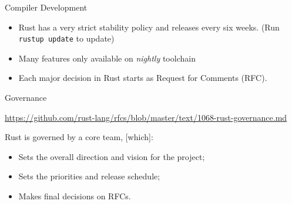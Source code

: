 \documentclass{beamer}
\begin{document}
\begin{frame}{Compiler Development} 
\begin{itemize} [label=$\bullet$] 
\item
Rust has a very strict stability policy and releases every six weeks. (Run
\texttt{rustup update} to update)
\item
Many features only available on \emph{nightly} toolchain
\item 
Each major decision in Rust starts as Request for Comments (RFC).
\end{itemize} 
\end{frame} 

\begin{frame}{Governance} 

\url{https://github.com/rust-lang/rfcs/blob/master/text/1068-rust-governance.md}
\begin{block}{}
Rust is governed by a core team, [which]:
\begin{itemize} [label=$\bullet$] 
\item    Sets the overall direction and vision for the project;
\item    Sets the priorities and release schedule;
\item    Makes final decisions on RFCs.
\end{itemize}
\end{block}
\end{frame} 
\end{document}

